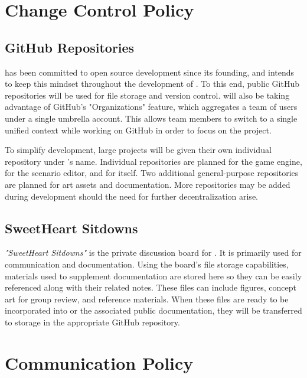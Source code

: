 \documentclass{GlobalDocument}
\begin{document}
\chapter{Change Control Policy}
\label{ch:change-control-policy}
\section{GitHub Repositories}
\ourteam{} has been committed to open source development since its founding, and intends to keep this mindset throughout the development of \ourgame{}. To this end, public GitHub repositories will be used for file storage and version control. \ourteam{} will also be taking advantage of GitHub's "Organizations" feature, which aggregates a team of users under a single umbrella account. This allows team members to switch to a single unified context while working on GitHub in order to focus on the project.

To simplify development, large projects will be given their own individual repository under \ourteam{}'s name. Individual repositories are planned for the game engine, for the scenario editor, and for \ourgame{} itself. Two additional general-purpose repositories are planned for art assets and documentation. More repositories may be added during development should the need for further decentralization arise.

\section{SweetHeart Sitdowns}
\textit{"SweetHeart Sitdowns"} is the private discussion board for \ourteam{}. It is primarily used for communication and documentation. Using the board's file storage capabilities, materials used to supplement documentation are stored here so they can be easily referenced along with their related notes. These files can include figures, concept art for group review, and reference materials. When these files are ready to be incorporated into \ourgame{} or the associated public documentation, they will be transferred to storage in the appropriate GitHub repository.

\chapter{Communication Policy}
\end{document}
